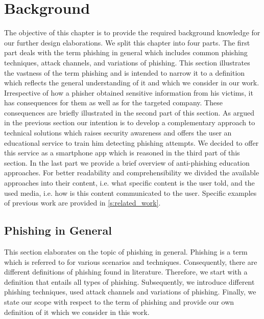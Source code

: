 \section{Background}
\label{s:background}
The objective of this chapter is to provide the required background knowledge for our further design elaborations. 
We split this chapter into four parts.
The first part deals with the term phishing in general which includes common phishing techniques, attack channels, and variations of phishing.
This section illustrates the vastness of the term phishing and is intended to narrow it to a definition which reflects the general understanding of it and which we consider in our work.
Irrespective of how a phisher obtained sensitive information from his victims, it has consequences for them as well as for the targeted company.
These consequences are briefly illustrated in the second part of this section.
As argued in the previous section our intention is to develop a complementary approach to technical solutions which raises security awareness and offers the user an educational service to train him detecting phishing attempts.
We decided to offer this service as a smartphone app which is reasoned in the third part of this section.
In the last part we provide a brief overview of anti-phishing education approaches.
For better readability and comprehensibility we divided the available approaches into their content, i.e. what specific content is the user told, and the used media, i.e. how is this content communicated to the user. Specific examples of previous work are provided in \autoref{s:related_work}.

\subsection{Phishing in General}
\label{s:phishing_general}
This section elaborates on the topic of phishing in general.
Phishing is a term which is referred to for various scenarios and techniques.
Consequently, there are different definitions of phishing found in literature.
Therefore, we start with a definition that entails all types of phishing.
Subsequently, we introduce different phishing techniques, used attack channels and variations of phishing.
Finally, we state our scope with respect to the term of phishing and provide our own definition of it which we consider in this work.
